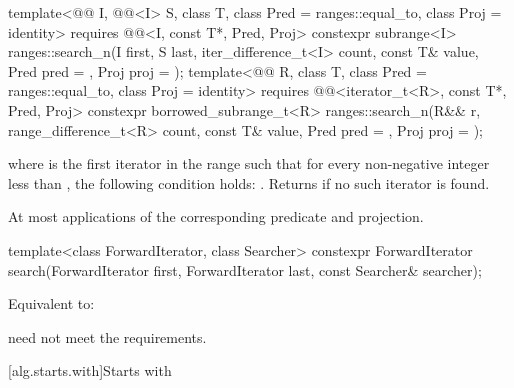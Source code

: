 %
\begin{itemdecl}
template<@@ I, @@<I> S, class T,
         class Pred = ranges::equal_to, class Proj = identity>
  requires @@<I, const T*, Pred, Proj>
  constexpr subrange<I>
    ranges::search_n(I first, S last, iter_difference_t<I> count,
                     const T& value, Pred pred = {}, Proj proj = {});
template<@@ R, class T, class Pred = ranges::equal_to,
         class Proj = identity>
  requires @@<iterator_t<R>, const T*, Pred, Proj>
  constexpr borrowed_subrange_t<R>
    ranges::search_n(R&& r, range_difference_t<R> count,
                     const T& value, Pred pred = {}, Proj proj = {});
\end{itemdecl}

\begin{itemdescr}
\pnum
\returns
{}
where  is the first iterator in the range 
such that for every non-negative integer  less than ,
the following condition holds:
.
Returns  if no such iterator is found.

\pnum
\complexity
At most  applications
of the corresponding predicate and projection.
\end{itemdescr}

%
\begin{itemdecl}
template<class ForwardIterator, class Searcher>
  constexpr ForwardIterator
    search(ForwardIterator first, ForwardIterator last, const Searcher& searcher);
\end{itemdecl}

\begin{itemdescr}
\pnum
\effects
Equivalent to: 

\pnum
\remarks
{} need not meet the  requirements.
\end{itemdescr}

[alg.starts.with]{Starts with}

